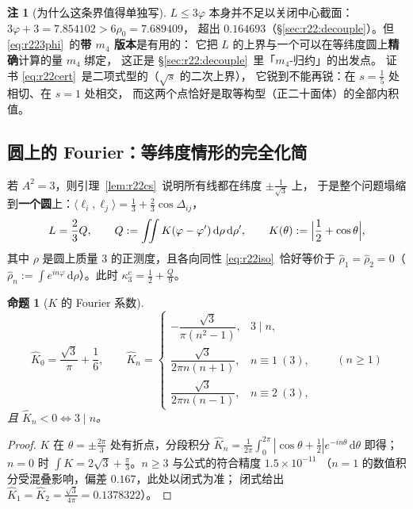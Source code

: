 \documentclass[UTF8,11pt]{ctexart}
\newtheorem{proposition}[theorem]{命题}
\theoremstyle{definition}
\newtheorem{remark}[theorem]{注}
\newcommand{\dd}{\,\mathrm{d}}
\begin{document}
\begin{remark}[为什么这条界值得单独写]\label{rem:r223phi}
$L\le3\varphi$ 本身并不足以关闭中心截面：$3\varphi+3=7.854102>6\rho_0=7.689409$，
超出 $0.164693$（\S\ref{sec:r22:decouple}）。但 \eqref{eq:r223phi}~的\textbf{带 $m_4$ 版本}是有用的：
它把 $L$ 的上界与一个可以在等纬度圆上\textbf{精确}计算的量 $m_4$ 绑定，
这正是 \S\ref{sec:r22:decouple}~里「$m_4$-归约」的出发点。
证书 \eqref{eq:r22cert}~是二项式型的（$\sqrt s$ 的二次上界），
它锐到不能再锐：在 $s=\frac15$ 处相切、在 $s=1$ 处相交，
而这两个点恰好是取等构型（正二十面体）的全部内积值。
\end{remark}

\subsection{圆上的 Fourier：等纬度情形的完全化简}\label{sec:r22:circle}

若 $A^2=3$，则引理~\ref{lem:r22cs}~说明所有线都在纬度 $\pm\frac1{\sqrt3}$ 上，
于是整个问题塌缩到\textbf{一个圆}上：$\langle\ell_i,\ell_j\rangle=\frac13+\frac23\cos\Delta_{ij}$，
\[
L=\frac23Q,\qquad Q:=\iint K(\varphi-\varphi')\dd\rho\dd\rho',\qquad
K(\theta):=\Bigl|\frac12+\cos\theta\Bigr|,
\]
其中 $\rho$ 是圆上质量 $3$ 的正测度，且各向同性 \eqref{eq:r22iso}~恰好等价于
$\hat\rho_1=\hat\rho_2=0$（$\hat\rho_n:=\int e^{in\varphi}\dd\rho$）。此时 $\kappa_3^c=\frac12+\frac Q9$。

\begin{proposition}[$K$ 的 Fourier 系数]\label{prop:r22K}
\begin{equation}\label{eq:r22K}
\hat K_0=\frac{\sqrt3}\pi+\frac16,\qquad
\hat K_n=\begin{cases}
-\dfrac{\sqrt3}{\pi(n^2-1)}, & 3\mid n,\\[6pt]
\dfrac{\sqrt3}{2\pi n(n+1)}, & n\equiv1\ (3),\\[6pt]
\dfrac{\sqrt3}{2\pi n(n-1)}, & n\equiv2\ (3),
\end{cases}\qquad(n\ge1)
\end{equation}
且 $\hat K_n<0\iff3\mid n$。
\end{proposition}

\begin{proof}
$K$ 在 $\theta=\pm\frac{2\pi}3$ 处有折点，分段积分
$\hat K_n=\frac1{2\pi}\int_0^{2\pi}|\cos\theta+\frac12|e^{-in\theta}\dd\theta$
即得；$n=0$ 时 $\int K=2\sqrt3+\frac\pi3$。$n\ge3$ 与公式的符合精度 $1.5\times10^{-11}$
（$n=1$ 的数值积分受混叠影响，偏差 $0.167$，此处以闭式为准；
闭式给出 $\hat K_1=\hat K_2=\frac{\sqrt3}{4\pi}=0.1378322$）。
\end{proof}
\end{document}

